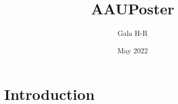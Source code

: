 \documentclass{article}
\title{AAUPoster}
\author{Gala H-R}
\date{May 2022}
\begin{document}
\maketitle

\section{Introduction}
\end{document}
